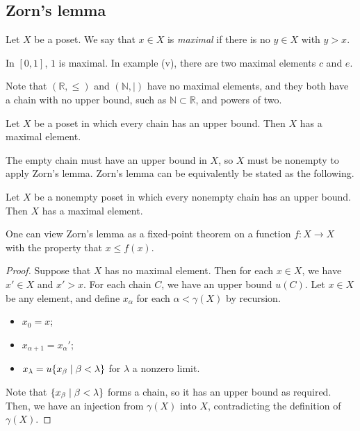 \subsection{Zorn's lemma}
\begin{definition}
    Let \( X \) be a poset.
    We say that \( x \in X \) is \emph{maximal} if there is no \( y \in X \) with \( y > x \).
\end{definition}
\begin{example}
    In \( [0,1] \), \( 1 \) is maximal.
    In example (v), there are two maximal elements \( c \) and \( e \).
\end{example}
Note that \( (\mathbb R, \leq) \) and \( (\mathbb N, \mid) \) have no maximal elements, and they both have a chain with no upper bound, such as \( \mathbb N \subset \mathbb R \), and powers of two.
\begin{theorem}
    Let \( X \) be a poset in which every chain has an upper bound.
    Then \( X \) has a maximal element.
\end{theorem}
The empty chain must have an upper bound in \( X \), so \( X \) must be nonempty to apply Zorn's lemma.
Zorn's lemma can be equivalently be stated as the following.
\begin{theorem}
    Let \( X \) be a nonempty poset in which every nonempty chain has an upper bound.
    Then \( X \) has a maximal element.
\end{theorem}
One can view Zorn's lemma as a fixed-point theorem on a function \( f \colon X \to X \) with the property that \( x \leq f(x) \).
\begin{proof}
    Suppose that \( X \) has no maximal element.
    Then for each \( x \in X \), we have \( x' \in X \) and \( x' > x \).
    For each chain \( C \), we have an upper bound \( u(C) \).
    Let \( x \in X \) be any element, and define \( x_\alpha \) for each \( \alpha < \gamma(X) \) by recursion.
    \begin{itemize}
        \item \( x_0 = x \);
        \item \( x_{\alpha + 1} = x_\alpha' \);
        \item \( x_\lambda = u\qty{x_\beta \mid \beta < \lambda} \) for \( \lambda \) a nonzero limit.
    \end{itemize}
    Note that \( \qty{x_\beta \mid \beta < \lambda} \) forms a chain, so it has an upper bound as required.
    Then, we have an injection from \( \gamma(X) \) into \( X \), contradicting the definition of \( \gamma(X) \).
\end{proof}
